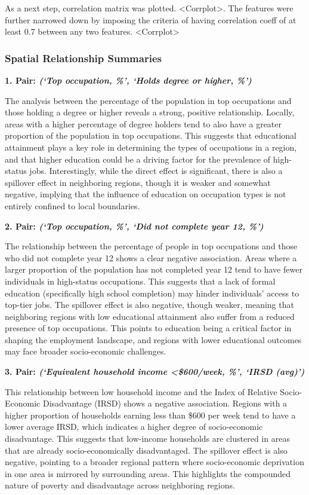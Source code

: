 \documentclass[
	a4paper, %
	10pt, %
	unnumberedsections, %
	twoside, %
]{LTJournalArticle}
\begin{document}
As a next step, correlation matrix was plotted. <Corrplot>. The features were further narrowed down by imposing the criteria of having correlation coeff of at least $0.7$ between any two features. <Corrplot>



\subsubsection{Spatial Relationship Summaries}

\textbf{1. Pair: \textit{(‘Top occupation, \%’, ‘Holds degree or higher, \%’)}} 

The analysis between the percentage of the population in top occupations and those holding a degree or higher reveals a strong, positive relationship. Locally, areas with a higher percentage of degree holders tend to also have a greater proportion of the population in top occupations. This suggests that educational attainment plays a key role in determining the types of occupations in a region, and that higher education could be a driving factor for the prevalence of high-status jobs. Interestingly, while the direct effect is significant, there is also a spillover effect in neighboring regions, though it is weaker and somewhat negative, implying that the influence of education on occupation types is not entirely confined to local boundaries.

\textbf{2. Pair: \textit{(‘Top occupation, \%’, ‘Did not complete year 12, \%’)}} 

The relationship between the percentage of people in top occupations and those who did not complete year 12 shows a clear negative association. Areas where a larger proportion of the population has not completed year 12 tend to have fewer individuals in high-status occupations. This suggests that a lack of formal education (specifically high school completion) may hinder individuals’ access to top-tier jobs. The spillover effect is also negative, though weaker, meaning that neighboring regions with low educational attainment also suffer from a reduced presence of top occupations. This points to education being a critical factor in shaping the employment landscape, and regions with lower educational outcomes may face broader socio-economic challenges.


\textbf{3. Pair: \textit{(‘Equivalent household income <\$600/week, \%’, ‘IRSD (avg)’)}} 

This relationship between low household income and the Index of Relative Socio-Economic Disadvantage (IRSD) shows a negative association. Regions with a higher proportion of households earning less than \$600 per week tend to have a lower average IRSD, which indicates a higher degree of socio-economic disadvantage. This suggests that low-income households are clustered in areas that are already socio-economically disadvantaged. The spillover effect is also negative, pointing to a broader regional pattern where socio-economic deprivation in one area is mirrored by surrounding areas. This highlights the compounded nature of poverty and disadvantage across neighboring regions.
\end{document}

